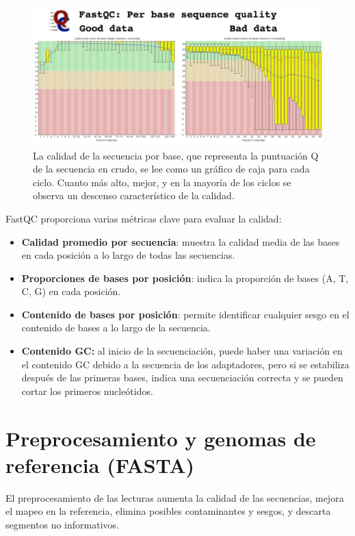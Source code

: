 \begin{figure}[htbp]
\centering
\includegraphics[width = \textwidth]{figs/good-bad-fastq.png}
\caption{La calidad de la secuencia por base, que representa la puntuación Q de la secuencia en crudo, se lee como un gráfico de caja para cada ciclo. Cuanto más alto, mejor, y en la mayoría de los ciclos se observa un descenso característico de la calidad.}
\end{figure}

FastQC proporciona varias métricas clave para evaluar la calidad: 
\begin{itemize} 
\item \textbf{Calidad promedio por secuencia}: muestra la calidad media de las bases en cada posición a lo largo de todas las secuencias. 
\item \textbf{Proporciones de bases por posición}: indica la proporción de bases (A, T, C, G) en cada posición. 
\item \textbf{Contenido de bases por posición}: permite identificar cualquier sesgo en el contenido de bases a lo largo de la secuencia. 
\item \textbf{Contenido GC:} al inicio de la secuenciación, puede haber una variación en el contenido GC debido a la secuencia de los adaptadores, pero si se estabiliza después de las primeras bases, indica una secuenciación correcta y se pueden cortar los primeros nucleótidos. 
\end{itemize}

\section{Preprocesamiento y genomas de referencia (FASTA)} 
El preprocesamiento de las lecturas aumenta la calidad de las secuencias, mejora el mapeo en la referencia, elimina posibles contaminantes y sesgos, y descarta segmentos no informativos.

